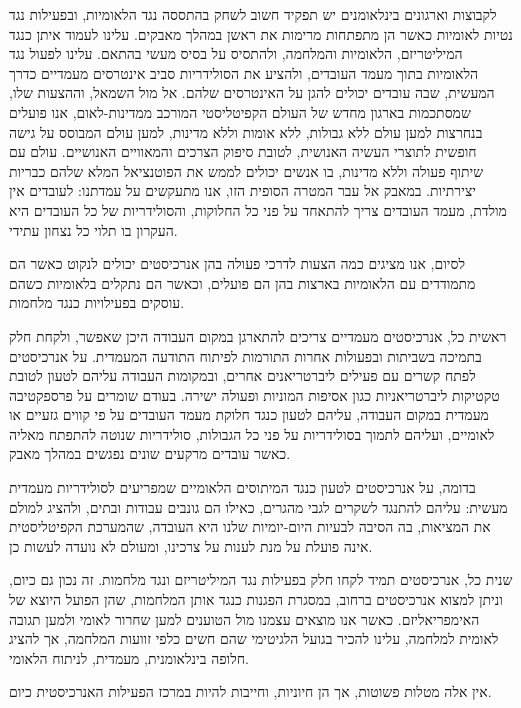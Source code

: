 לקבוצות וארגונים בינלאומנים יש תפקיד חשוב לשחק בהתססה נגד הלאומיות, ובפעילות נגד נטיות לאומיות כאשר הן מתפתחות מרימות את ראשן במהלך מאבקים. עלינו לעמוד איתן כנגד המיליטריזם, הלאומיות והמלחמה, ולהתסיס על בסיס מעשי בהתאם. עלינו לפעול נגד הלאומיות בתוך מעמד העובדים, ולהציע את הסולידריות סביב אינטרסים מעמדיים כדרך המעשית, שבה עובדים יכולים להגן על האינטרסים שלהם. אל מול השמאל, וההצעות שלו, שמסתכמות בארגון מחדש של העולם הקפיטליסטי המורכב ממדינות-לאום, אנו פועלים בנחרצות למען עולם ללא גבולות, ללא אומות וללא מדינות, למען עולם המבוסס על גישה חופשית לתוצרי העשיה האנושית, לטובת סיפוק הצרכים והמאוויים האנושיים. עולם עם שיתוף פעולה וללא מדינות, בו אנשים יכולים לממש את הפוטנציאל המלא שלהם כבריות יצירתיות. במאבק אל עבר המטרה הסופית הזו, אנו מתעקשים על עמדתנו: לעובדים אין מולדת, מעמד העובדים צריך להתאחד על פני כל החלוקות, והסולידריות של כל העובדים היא העקרון בו תלוי כל נצחון עתידי.

לסיום, אנו מציגים כמה הצעות לדרכי פעולה בהן אנרכיסטים יכולים לנקוט כאשר הם מתמודדים עם הלאומיות בארצות בהן הם פועלים, וכאשר הם נתקלים בלאומיות כשהם עוסקים בפעילויות כנגד מלחמות.

ראשית כל, אנרכיסטים מעמדיים צריכים להתארגן במקום העבודה היכן שאפשר, ולקחת חלק בתמיכה בשביתות ובפעולות אחרות התורמות לפיתוח התודעה המעמדית. על אנרכיסטים לפתח קשרים עם פעילים ליברטריאנים אחרים, ובמקומות העבודה עליהם לטעון לטובת טקטיקות ליברטריאניות כגון אסיפות המוניות ופעולה ישירה. בעודם שומרים על פרספקטיבה מעמדית במקום העבודה, עליהם לטעון כנגד חלוקת מעמד העובדים על פי קווים גזעיים או לאומיים, ועליהם לתמוך בסולידריות על פני כל הגבולות, סולידריות שנוטה להתפתח מאליה כאשר עובדים מרקעים שונים נפגשים במהלך מאבק.

בדומה, על אנרכיסטים לטעון כנגד המיתוסים הלאומיים שמפריעים לסולידריות מעמדית מעשית: עליהם להתנגד לשקרים לגבי מהגרים, כאילו הם גונבים עבודות ובתים, ולהציג למולם את המציאות, בה הסיבה לבעיות היום-יומיות שלנו היא העובדה, שהמערכת הקפיטליסטית אינה פועלת על מנת לענות על צרכינו, ומעולם לא נועדה לעשות כן.

שנית כל, אנרכיסטים תמיד לקחו חלק בפעילות נגד המיליטריזם ונגד מלחמות. זה נכון גם כיום, וניתן למצוא אנרכיסטים ברחוב, במסגרת הפגנות כנגד אותן המלחמות, שהן הפועל היוצא של האימפריאליזם. כאשר אנו מוצאים עצמנו מול הטוענים למען שחרור לאומי ולמען תגובה לאומית למלחמה, עלינו להכיר בגועל הלגיטימי שהם חשים כלפי זוועות המלחמה, אך להציג חלופה בינלאומנית, מעמדית, לניתוח הלאומי.

אין אלה מטלות פשוטות, אך הן חיוניות, וחייבות להיות במרכז הפעילות האנרכיסטית כיום.



